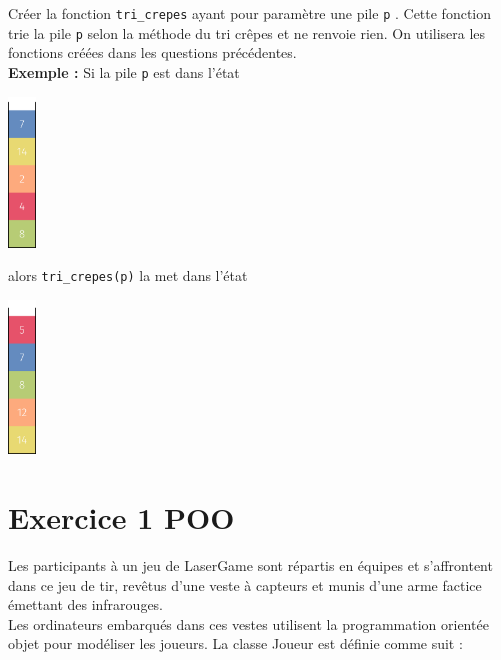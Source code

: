 \documentclass[a4paper,12pt,eval,firamath]{nsi}
\begin{document}
Créer la fonction \texttt{tri_crepes} ayant pour paramètre une pile \texttt{p} . Cette fonction trie la pile \texttt{p}  selon la
méthode du tri crêpes et ne renvoie rien. On utilisera les fonctions créées dans les questions précédentes.\\

\textbf{Exemple : } Si la pile \texttt{p} est dans l'état
\begin{center}
      \includegraphics[width=0.75cm]{img/pile4.png}
\end{center}
alors \texttt{tri_crepes(p)} la met dans l'état
\begin{center}
      \includegraphics[width=0.75cm]{img/pile5.png}
\end{center}

\section*{Exercice 1 \small\hfill POO}
\resetquestion

Les participants à un jeu de LaserGame sont répartis en équipes et s'affrontent dans ce jeu de tir, revêtus d'une veste à capteurs et munis d'une arme factice émettant des infrarouges.\\
Les ordinateurs embarqués dans ces vestes utilisent la programmation orientée objet pour modéliser les joueurs. La classe Joueur est définie comme suit :
\end{document}
